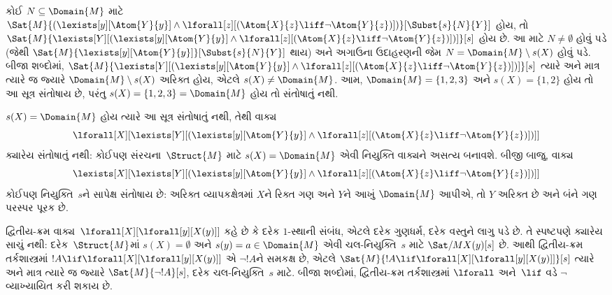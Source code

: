 \begin{ex}
  કોઈ $N \subseteq \Domain{M}$ માટે
  $\Sat{M}{(\lexists[y][\Atom{Y}{y}] \land \lforall[z][(\Atom{X}{z}
  \liff \lnot \Atom{Y}{z})])}[\Subst{s}{N}{Y}]$ હોય, તો
  $\Sat{M}{\lexists[Y][(\lexists[y][\Atom{Y}{y}] \land
  \lforall[z][(\Atom{X}{z} \liff \lnot \Atom{Y}{z})])]}[s]$ હોય છે.
  આ માટે $N \neq \emptyset$ હોવું પડે (જેથી
  $\Sat{M}{\lexists[y][\Atom{Y}{y}]}[\Subst{s}{N}{Y}]$ થાય) અને
  અગાઉના ઉદાહરણની જેમ $N = \Domain{M} \setminus s(X)$ હોવું પડે.
  બીજા શબ્દોમાં,
  $\Sat{M}{\lexists[Y][(\lexists[y][\Atom{Y}{y}] \land
  \lforall[z][(\Atom{X}{z} \liff \lnot \Atom{Y}{z})])]}[s]$
  ત્યારે અને માત્ર ત્યારે જ જ્યારે $\Domain{M} \setminus s(X)$
  અરિક્ત હોય, એટલે $s(X) \neq \Domain{M}$. આમ,
  $\Domain{M} = \{1, 2, 3\}$ અને $s(X) = \{1, 2\}$ હોય તો આ
  સૂત્ર સંતોષાય છે, પરંતુ $s(X) = \{1, 2, 3\} = \Domain{M}$
  હોય તો સંતોષાતું નથી.

  $s(X) = \Domain{M}$ હોય ત્યારે આ સૂત્ર સંતોષાતું નથી, તેથી
  વાક્ય
  \[
  \lforall[X][\lexists[Y][(\lexists[y][\Atom{Y}{y}] \land
      \lforall[z][(\Atom{X}{z} \liff \lnot \Atom{Y}{z})])]]
  \]
  ક્યારેય સંતોષાતું નથી: કોઈપણ સંરચના~$\Struct{M}$ માટે
  $s(X) = \Domain{M}$ એવી નિયુક્તિ વાક્યને અસત્ય બનાવશે.
  બીજી બાજુ, વાક્ય
  \[
  \lexists[X][\lexists[Y][(\lexists[y][\Atom{Y}{y}] \land
      \lforall[z][(\Atom{X}{z} \liff \lnot \Atom{Y}{z})])]]
  \]
  કોઈપણ નિયુક્તિ~$s$ને સાપેક્ષ સંતોષાય છે: અરિક્ત વ્યાપકક્ષેત્રમાં
  $X$ને રિક્ત ગણ અને $Y$ને આખું $\Domain{M}$ આપીએ, તો
  $Y$ અરિક્ત છે અને બંને ગણ પરસ્પર પૂરક છે.
\end{ex}

\begin{ex}
  દ્વિતીય-ક્રમ વાક્ય~$\lforall[X][\lforall[y][X(y)]]$ કહે છે
  કે દરેક $1$-સ્થાની સંબંધ, એટલે દરેક ગુણધર્મ, દરેક વસ્તુને લાગુ પડે
  છે. તે સ્પષ્ટપણે ક્યારેય સાચું નથી: દરેક~$\Struct{M}$માં
  $s(X) = \emptyset$ અને $s(y) = a \in \Domain{M}$ એવી
  ચલ-નિયુક્તિ~$s$ માટે $\Sat/{M}{X(y)}[s]$ છે. આથી દ્વિતીય-ક્રમ
  તર્કશાસ્ત્રમાં $!A \lif \lforall[X][\lforall[y][X(y)]]$ એ
  $\lnot !A$ને સમકક્ષ છે, એટલે
  $\Sat{M}{!A \lif
  \lforall[X][\lforall[y][X(y)]]}[s]$ ત્યારે અને માત્ર ત્યારે જ
  જ્યારે $\Sat{M}{\lnot !A}[s]$, દરેક ચલ-નિયુક્તિ~$s$ માટે.
  બીજા શબ્દોમાં, દ્વિતીય-ક્રમ
  તર્કશાસ્ત્રમાં $\lforall$ અને~$\lif$ વડે $\lnot$ વ્યાખ્યાયિત
  કરી શકાય છે.
\end{ex}

